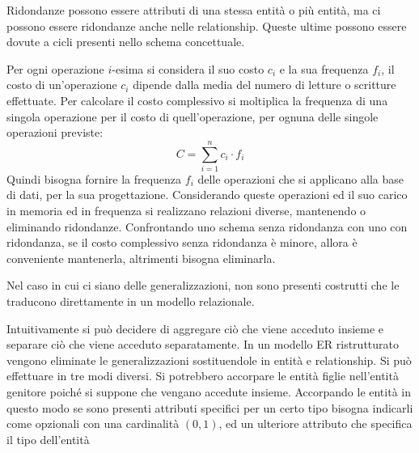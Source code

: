\documentclass{article}
\numberwithin{equation}{subsection}
\begin{document}
Ridondanze possono essere attributi di una stessa entità o più entità, ma ci possono essere ridondanze anche nelle relationship. Queste ultime possono essere dovute a cicli presenti nello schema concettuale. 

Per ogni operazione $i$-esima si considera il suo costo $c_i$ e la sua frequenza $f_i$, 
il costo di un'operazione $c_i$ dipende dalla media del numero di letture o scritture effettuate. 
Per calcolare il costo complessivo si moltiplica la frequenza di una singola operazione per il costo di quell'operazione, per ognuna delle singole operazioni previste:
\begin{equation}
    C=\displaystyle\sum_{i=1}^nc_i\cdot f_i
\end{equation}
Quindi bisogna fornire la frequenza $f_i$ delle operazioni che si applicano alla base di dati, per la sua progettazione. Considerando queste operazioni ed il suo 
carico in memoria ed in frequenza si realizzano relazioni diverse, mantenendo o eliminando ridondanze. 
Confrontando uno schema senza ridondanza con uno con ridondanza, se il costo complessivo senza ridondanza è minore, allora è conveniente mantenerla, altrimenti bisogna eliminarla. 


Nel caso in cui ci siano delle generalizzazioni, non sono presenti costrutti che le traducono direttamente in un modello relazionale. 

Intuitivamente si può decidere di aggregare ciò che viene acceduto insieme e separare ciò che viene acceduto separatamente. In un modello ER ristrutturato vengono eliminate le 
generalizzazioni sostituendole in entità e relationship. Si può effettuare in tre modi diversi. 
Si potrebbero accorpare le entità figlie nell'entità genitore poiché si suppone che vengano accedute insieme. Accorpando le entità in questo modo se sono presenti attributi specifici per un certo tipo bisogna indicarli come opzionali con una cardinalità $(0,1)$, ed un ulteriore attributo che specifica il tipo dell'entità 
\end{document}
